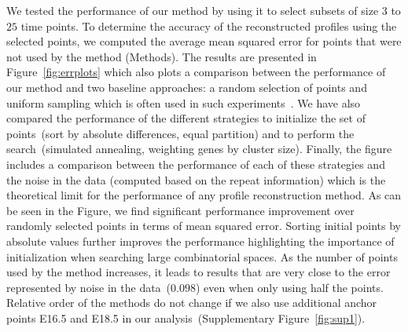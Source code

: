 \documentclass[10pt]{article}
\newcommand{\Tempselect}{\textit{TempSelect}\xspace}
\begin{document}

We tested the performance of our method by using it to select
subsets of size $3$ to $25$ time points. To determine the accuracy of the reconstructed profiles
using the selected points, we computed the average mean squared error for points
that were not used by the method (Methods). The results are
presented in Figure~\ref{fig:errplots} which also plots a
comparison between the performance of our method and two baseline
approaches: a random selection of points and uniform sampling which is
often used in such experiments~\cite{bar2012}. We have also compared the performance of the
different strategies to initialize the set of points~(sort by absolute
differences, equal partition) and to perform the search~(simulated
annealing, weighting genes by cluster size). Finally, the figure includes a comparison between the
performance of each of these strategies and the noise in the data (computed based on the repeat
information) which is the theoretical limit for the performance of
any profile reconstruction method. As can be seen in the Figure, we
find significant performance improvement over randomly selected
points in terms of mean squared error. Sorting initial points by absolute values further improves
the performance highlighting the importance of initialization when
searching large combinatorial spaces. As the number of
points used by the method increases, it leads to results that are very close to the error represented by
noise in the data~($0.098$) even when only using half the points. Relative order of the methods do not change if we also use
additional anchor points E16.5 and E18.5 in our analysis~(Supplementary Figure~\ref{fig:sup1}).
\end{document}
